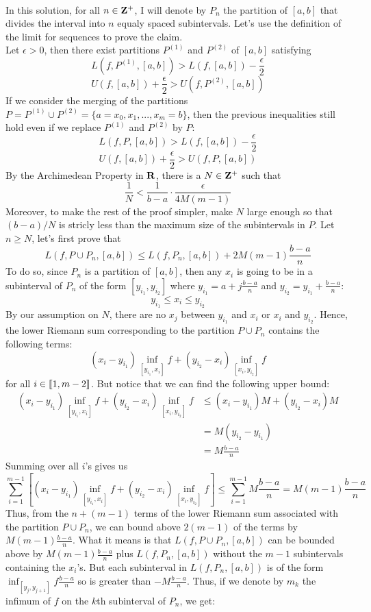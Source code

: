 \begin{solution}
    \\ In this solution, for all $n \in \mathbf{Z}^+$, I will denote by $P_n$ the partition of $[a,b]$ that divides the interval into $n$ equaly spaced subintervals. Let's use the definition of the limit for sequences to prove the claim. \\
    Let $\epsilon > 0$, then there exist partitions $P^{(1)}$ and $P^{(2)}$ of $[a,b]$ satisfying 
    $$L(f, P^{(1)}, [a,b]) > L(f, [a,b]) - \frac{\epsilon}{2}$$
    $$U(f, [a,b]) + \frac{\epsilon}{2} > U(f, P^{(2)}, [a,b])$$
    If we consider the merging of the partitions $P = P^{(1)} \cup P^{(2)} = \{a=x_0, x_1, ..., x_m = b\}$, then the previous inequalities still hold even if we replace $P^{(1)}$ and $P^{(2)}$ by $P$:
    $$L(f, P, [a,b]) > L(f, [a,b]) - \frac{\epsilon}{2}$$
    $$U(f, [a,b]) + \frac{\epsilon}{2} > U(f, P, [a,b])$$
    By the Archimedean Property in $\mathbf{R}$, there is a $N \in \mathbf{Z}^+$ such that 
    $$\frac{1}{N} < \frac{1}{b-a}\cdot \frac{\epsilon}{4M(m-1)}$$
    Moreover, to make the rest of the proof simpler, make $N$ large enough so that $(b-a)/N$ is stricly less than the maximum size of the subintervals in $P$. Let $n \geq N$, let's first prove that
    $$L(f, P\cup P_n, [a,b]) \leq L(f, P_n, [a,b]) + 2M(m-1)\frac{b-a}{n }$$
    To do so, since $P_n$ is a partition of $[a,b]$, then any $x_i$ is going to be in a subinterval of $P_n$ of the form $[y_{i_1}, y_{i_2}]$ where $y_{i_1} = a + j\frac{b-a}{n}$ and $y_{i_2} = y_{i_1} + \frac{b-a}{n}$:
    $$y_{i_1} \leq x_i \leq y_{i_2}$$
    By our assumption on $N$, there are no $x_j$ between $y_{i_1}$ and $x_i$ or $x_i$ and $y_{i_2}$. Hence, the lower Riemann sum corresponding to the partition $P\cup P_n$ contains the following terms:
    $$(x_i - y_{i_1})\inf_{[y_{i_1}, x_i]} f + (y_{i_2} - x_i)\inf_{[x_i, y_{i_2}]} f$$
    for all $i \in \llbracket 1 , m-2 \rrbracket$. But notice that we can find the following upper bound:
    \begin{align*}
        (x_i - y_{i_1})\inf_{[y_{i_1}, x_i]} f + (y_{i_2} - x_i)\inf_{[x_i, y_{i_2}]} f &\leq (x_i - y_{i_1})M + (y_{i_2} - x_i)M \\
        &= M(y_{i_2} - y_{i_1}) \\
        &= M\frac{b-a}{n}
    \end{align*}
    Summing over all $i$'s gives us
    $$\sum_{i=1}^{m-1}\left[(x_i - y_{i_1})\inf_{[y_{i_1}, x_i]} f + (y_{i_2} - x_i)\inf_{[x_i, y_{i_2}]} f \right] \leq  \sum_{i=1}^{m-1} M\frac{b-a}{n} = M(m-1)\frac{b-a}{n}$$
    Thus, from the $n + (m-1)$ terms of the lower Riemann sum associated with the partition $P \cup P_n$, we can bound above $2(m-1)$ of the terms by $M(m-1)\frac{b-a}{n}$. What it means is that $L(f, P\cup P_n, [a,b])$ can be bounded above by $M(m-1)\frac{b-a}{n}$ plus $L(f, P_n, [a,b])$ without the $m-1$ subintervals containing the $x_i$'s. But each subinterval in $L(f, P_n, [a,b])$ is of the form $\inf_{[y_j, y_{j+1}]}f \frac{b-a}{n}$ so is greater than $-M\frac{b-a}{n}$. Thus, if we denote by $m_k$ the infimum of $f$ on the $k$th subinterval of $P_n$, we get:

\end{solution}

